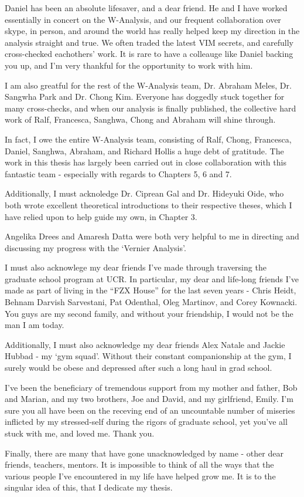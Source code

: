 Daniel has been an absolute lifesaver, and a dear friend. He and I have worked
essentially in concert on the W-Analysis, and our frequent collaboration over
skype, in person, and around the world has really helped keep my direction in
the analysis straight and true.  We often traded the latest VIM secrets, and
carefully cross-checked eachothers' work. It is rare to have a colleauge like
Daniel backing you up, and I'm very thankful for the opportunity to work with
him.

I am also greatful for the rest of the W-Analysis team, Dr. Abraham Meles, Dr.
Sangwha Park and Dr. Chong Kim. Everyone has doggedly stuck together for many
cross-checks, and when our analysis is finally published, the collective hard
work of Ralf, Francesca, Sanghwa, Chong and Abraham will shine through.

In fact, I owe the entire W-Analysis team, consisting of Ralf, Chong,
Francesca, Daniel, Sanghwa, Abraham, and Richard Hollis a huge debt of
gratitude. The work in this thesis has largely been carried out in close
collaboration with this fantastic team - especially with regards to Chapters 5,
6 and 7.

Additionally, I must acknoledge Dr. Ciprean Gal and Dr. Hideyuki Oide, who both
wrote excellent theoretical introductions to their respective theses, which I
have relied upon to help guide my own, in Chapter 3.

Angelika Drees and Amaresh Datta were both very helpful to me in directing and
discussing my progress with the `Vernier Analysis'.

I must also acknowlege my dear friends I've made through traversing the graduate
school program at UCR. In particular, my dear and life-long friends I've made as
part of living in the ``FZX House'' for the last seven years - Chris Heidt, Behnam
Darvish Sarvestani, Pat Odenthal, Oleg Martinov, and Corey Kownacki. You guys
are my second family, and without your friendship, I would not be the man I am
today.

Additionally, I must also acknowledge my dear friends Alex Natale and Jackie
Hubbad - my `gym squad'. Without their constant companionship at the gym, I
surely would be obese and depressed after such a long haul in grad school.

I've been the beneficiary of tremendous support from my mother and father, Bob
and Marian, and my two brothers, Joe and David, and my girlfriend, Emily.
I'm sure you all have been on the receving end of an uncountable number of
miseries inflicted by my stressed-self during the rigors of graduate school, yet
you've all stuck with me, and loved me.  Thank you.

Finally, there are many that have gone unacknowledged by name - other dear
friends, teachers, mentors. It is impossible to think of all the ways that the
various people I've encountered in my life have helped grow me. It is to the
singular idea of this, that I dedicate my thesis.
